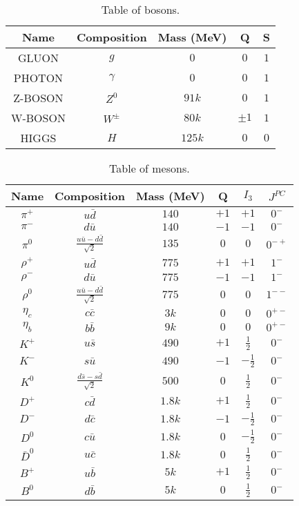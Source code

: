 \documentclass{article}
\begin{document}
\begin{table}[h!]
    \centering
    \begin{tabular}{||c c c c c||} 
     \hline
     Name & Composition & Mass (MeV) & Q & S \\ [0.5ex] 
     \hline\hline
     GLUON & $g$ & $0$ & $0$ & $1$ \\[1ex] 
     PHOTON & $\gamma$ & $0$ & $0$ & $1$ \\[1ex]
     Z-BOSON & $Z^0$ & $91k$ & $0$ & $1$ \\[1ex]
     W-BOSON & $W^\pm$ & $80k$ & $\pm 1$ & $1$ \\[1ex]
     HIGGS & $H$ & $125k$ & $0$ & $0$ \\[1ex]
     \hline
    \end{tabular}
    \caption{Table of bosons.}
    \label{table:bosons}
\end{table}

\begin{table}[h!]
    \centering
    \begin{tabular}{||c c c c c c||} 
    \hline
    Name & Composition & Mass (MeV) & Q & $I_3$ & $J^{PC}$ \\ [0.5ex] 
    \hline\hline
    $\pi^+$ & $u\bar{d}$ & $140$ & $+1$ & $+1$ & $0^{-}$ \\[1ex]
    $\pi^-$ & $d\bar{u}$ & $140$ & $-1$ & $-1$ & $0^{-}$ \\[1ex]
    $\pi^0$ & $\frac{u\bar{u}-d\bar{d}}{\sqrt{2}}$ & $135$ & $0$ & $0$ & $0^{-+}$ \\[1ex]
    $\rho^+$ & $u\bar{d}$ & $775$ & $+1$ & $+1$ & $1^{-}$ \\[1ex]
    $\rho^-$ & $d\bar{u}$ & $775$ & $-1$ & $-1$ & $1^{-}$ \\[1ex]
    $\rho^0$ & $\frac{u\bar{u}-d\bar{d}}{\sqrt{2}}$ & $775$ & $0$ & $0$ & $1^{--}$ \\[1ex]
    $\eta_c$ & $c\bar{c}$ & $3k$ & $0$ & $0$ & $0^{+-}$ \\[1ex]
    $\eta_b$ & $b\bar{b}$ & $9k$ & $0$ & $0$ & $0^{+-}$ \\[1ex]
    $K^+$ & $u\bar{s}$ & $490$ & $+1$ & $\frac{1}{2}$ & $0^{-}$ \\[1ex]
    $K^-$ & $s\bar{u}$ & $490$ & $-1$ & $-\frac{1}{2}$ & $0^{-}$ \\[1ex]
    $K^0$ & $\frac{d\bar{s}-s\bar{d}}{\sqrt{2}}$ & $500$ & $0$ & $\frac{1}{2}$ & $0^{-}$ \\[1ex]
    $D^+$ & $c\bar{d}$ & $1.8k$ & $+1$ & $\frac{1}{2}$ & $0^{-}$ \\[1ex]
    $D^-$ & $d\bar{c}$ & $1.8k$ & $-1$ & $-\frac{1}{2}$ & $0^{-}$ \\[1ex]
    $D^0$ & $c\bar{u}$ & $1.8k$ & $0$ & $-\frac{1}{2}$ & $0^{-}$ \\[1ex]
    $\bar{D}^0$ & $u\bar{c}$ & $1.8k$ & $0$ & $\frac{1}{2}$ & $0^{-}$ \\[1ex]
    $B^+$ & $u\bar{b}$ & $5k$ & $+1$ & $\frac{1}{2}$ & $0^{-}$ \\[1ex]
    $B^0$ & $d\bar{b}$ & $5k$ & $0$ & $\frac{1}{2}$ & $0^{-}$ \\[1ex]
    \hline
    \end{tabular}
    \caption{Table of mesons.}
    \label{table:mesons}
\end{table}
\end{document}
